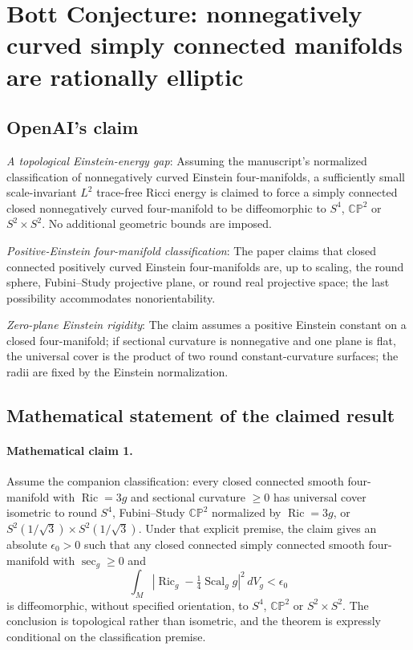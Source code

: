 \documentclass[11pt]{article}
\begin{document}
\section*{Bott Conjecture: nonnegatively curved simply connected manifolds are rationally elliptic}

\subsection{OpenAI's claim}
\textit{A topological Einstein-energy gap}: Assuming the manuscript's normalized classification of nonnegatively curved Einstein four-manifolds, a sufficiently small scale-invariant $L^2$ trace-free Ricci energy is claimed to force a simply connected closed nonnegatively curved four-manifold to be diffeomorphic to $S^4$, $\mathbb{CP}^2$ or $S^2\times S^2$. No additional geometric bounds are imposed.

\textit{Positive-Einstein four-manifold classification}: The paper claims that closed connected positively curved Einstein four-manifolds are, up to scaling, the round sphere, Fubini--Study projective plane, or round real projective space; the last possibility accommodates nonorientability.

\textit{Zero-plane Einstein rigidity}: The claim assumes a positive Einstein constant on a closed four-manifold; if sectional curvature is nonnegative and one plane is flat, the universal cover is the product of two round constant-curvature surfaces; the radii are fixed by the Einstein normalization.

\subsection{Mathematical statement of the claimed result}
\paragraph{Mathematical claim 1.} Assume the companion classification: every closed connected smooth four-manifold with $\operatorname{Ric}=3g$ and sectional curvature $\ge0$ has universal cover isometric to round $S^4$, Fubini--Study $\mathbb{CP}^2$ normalized by $\operatorname{Ric}=3g$, or $S^2(1/\sqrt3)\times S^2(1/\sqrt3)$. Under that explicit premise, the claim gives an absolute $\epsilon_0>0$ such that any closed connected simply connected smooth four-manifold with $\sec_g\ge0$ and \[\int_M\left|\operatorname{Ric}_g-\tfrac14\operatorname{Scal}_g g\right|^2\,dV_g<\epsilon_0\] is diffeomorphic, without specified orientation, to $S^4$, $\mathbb{CP}^2$ or $S^2\times S^2$. The conclusion is topological rather than isometric, and the theorem is expressly conditional on the classification premise.
\end{document}
